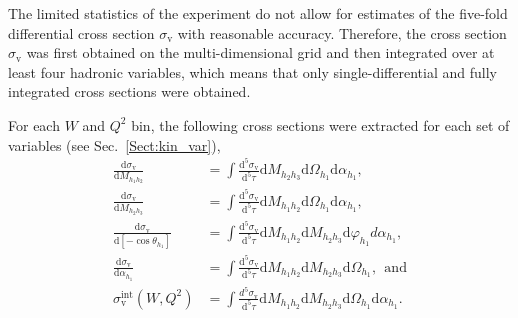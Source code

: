 \documentclass[prc,twocolumn,superscriptaddress,showpacs,amssymb,amsmath,amsfonts,aps,nofootinbib]{revtex4-1}
\begin{document}


The limited statistics of the experiment do not allow for estimates of the five-fold differential cross section $\sigma_{\text{v}}$ with reasonable accuracy. Therefore, the cross section $\sigma_{\text{v}}$ was first obtained on the multi-dimensional grid and then integrated over at least four hadronic variables, which means that only single-differential and fully integrated cross sections were obtained.


For each $W$ and $Q^{2}$ bin, the following cross sections were extracted for each set of variables (see Sec.\!~\ref{Sect:kin_var}),
\begin{equation}
\begin{aligned}
\frac{\textrm{d}\sigma_{\text{v}}}{\textrm{d}M_{h_{1}h_{2}}} & =\int\frac{\textrm{d}^{5}\sigma_{\text{v}}}{\textrm{d}^{5}\tau}\textrm{d}M_{h_{2}h_{3}}\textrm{d}\Omega_{h_{1}}\textrm{d}\alpha_{h_{1}}, \\
\frac{\textrm{d}\sigma_{\text{v}}}{\textrm{d}M_{h_{2}h_{3}}} & =\int\frac{\textrm{d}^{5}\sigma_{\text{v}}}{\textrm{d}^{5}\tau}\textrm{d}M_{h_{1}h_{2}}\textrm{d}\Omega_{h_{1}}\textrm{d}\alpha_{h_{1}}, \\
\frac{\textrm{d}\sigma_{\text{v}}}{\textrm{d}[-\cos\theta_{h_{1}}]} & =\int\frac{\textrm{d}^{5}\sigma_{\text{v}}}{\textrm{d}^{5}\tau}\textrm{d}M_{h_{1}h_{2}}\textrm{d}M_{h_{2}h_{3}}\textrm{d}\varphi_{h_{1}}d\alpha_{h_{1}}, \\
\frac{\textrm{d}\sigma_{\text{v}}}{\textrm{d}\alpha_{h_{1}}} & =\int\frac{\textrm{d}^{5}\sigma_{\text{v}}}{\textrm{d}^{5}\tau}\textrm{d}M_{h_{1}h_{2}}\textrm{d}M_{h_{2}h_{3}}\textrm{d}\Omega_{h_{1}},~~\text{and}\\
\sigma_{\text{v}}^{\text{int}} (W, Q^{2}) &= \int \frac{d^{5}\sigma_{\text{v}}}{\textrm{d}^{5}\tau}\textrm{d}M_{h_{1}h_{2}}\textrm{d}M_{h_{2}h_{3}}\textrm{d}\Omega_{h_{1}}\textrm{d}\alpha_{h_{1}}.
\end{aligned}
\label{inegr5diff}
\end{equation}

\end{document}

